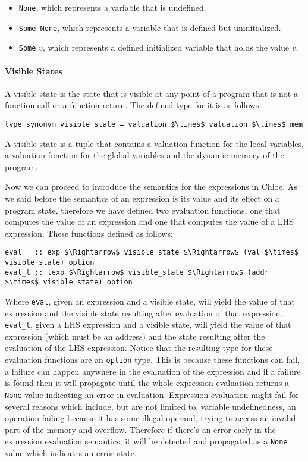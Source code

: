 \begin{itemize}
  \item{\verb|None|, which represents a variable that is undefined.}
  \item{\verb|Some None|, which represents a variable that is defined but uninitialized.}
  \item{\verb|Some| $v$, which represents a defined initialized variable that holds the value $v$.}
\end{itemize}

\paragraph{Visible States}\label{paragraph:visible_state}

A visible state is the state that is visible at any point of a program that is not a function call or a function return.
The defined type for it is as follows:

\begin{lstlisting}[frame=single, mathescape=true]
type_synonym visible_state = valuation $\times$ valuation $\times$ mem
\end{lstlisting}

A visible state is a tuple that contains a valuation function for the local variables, a valuation function for the global variables and the dynamic memory of the program.


Now we can proceed to introduce the semantics for the expressions in Chloe.
As we said before the semantics of an expression is its value and its effect on a program state, therefore we have defined two evaluation functions, one that computes the value of an expression and one that computes the value of a LHS expression.
These functions defined as follows:

\begin{lstlisting}[frame=single, mathescape=true]
eval   :: exp $\Rightarrow$ visible_state $\Rightarrow$ (val $\times$ visible_state) option
eval_l :: lexp $\Rightarrow$ visible_state $\Rightarrow$ (addr $\times$ visible_state) option
\end{lstlisting}

Where \verb|eval|, given an expression and a visible state, will yield the value of that expression and the visible state resulting after evaluation of that expression.
\verb|eval_l|, given a LHS expression and a visible state, will yield the value of that expression (which must be an address) and the state resulting after the evaluation of the LHS expression.
Notice that the resulting type for these evaluation functions are an \verb|option| type.
This is because these functions can fail, a failure can happen anywhere in the evaluation of the expression and if a failure is found then it will propagate until the whole expression evaluation returns a \verb|None| value indicating an error in evaluation.
Expression evaluation might fail for several reasons which include, but are not limited to, variable undefinedness, an operation failing because it has some illegal operand, trying to access an invalid part of the memory and overflow.
Therefore if there's an error early in the expression evaluation semantics, it will be detected and propagated as a \verb|None| value which indicates an error state.


